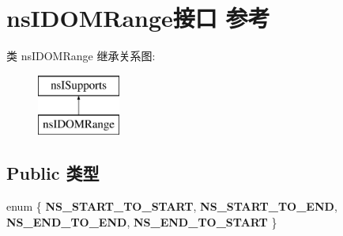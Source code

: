 \hypertarget{interfacens_i_d_o_m_range}{}\section{ns\+I\+D\+O\+M\+Range接口 参考}
\label{interfacens_i_d_o_m_range}
类 ns\+I\+D\+O\+M\+Range 继承关系图\+:\begin{figure}[H]
\begin{center}
\leavevmode
\includegraphics[height=2.000000cm]{interfacens_i_d_o_m_range}
\end{center}
\end{figure}
\subsection*{Public 类型}
\begin{DoxyCompactItemize}
\item 
\mbox{\label{interfacens_i_d_o_m_range_acdb1b57b9d1ee306bb1e4f2f9edf1613}} 
enum \{ {\bfseries N\+S\+\_\+\+S\+T\+A\+R\+T\+\_\+\+T\+O\+\_\+\+S\+T\+A\+RT}, 
{\bfseries N\+S\+\_\+\+S\+T\+A\+R\+T\+\_\+\+T\+O\+\_\+\+E\+ND}, 
{\bfseries N\+S\+\_\+\+E\+N\+D\+\_\+\+T\+O\+\_\+\+E\+ND}, 
{\bfseries N\+S\+\_\+\+E\+N\+D\+\_\+\+T\+O\+\_\+\+S\+T\+A\+RT}
 \}
\end{DoxyCompactItemize}
